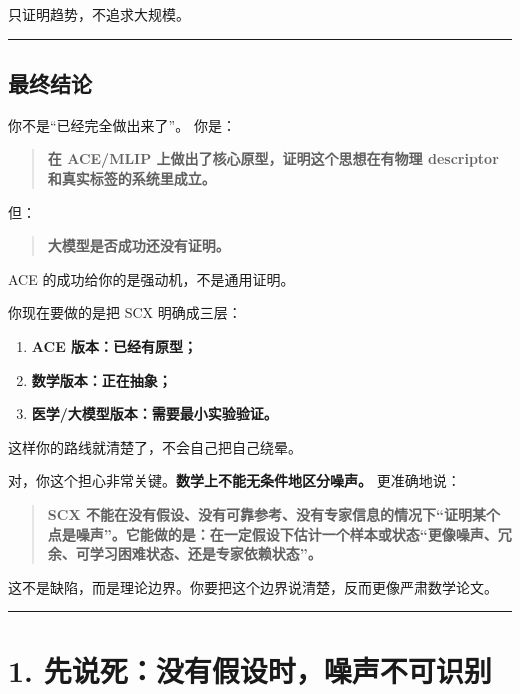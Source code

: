 \documentclass[
  12pt,
]{ctexart}
\providecommand{\tightlist}{%
  \setlength{\itemsep}{0pt}\setlength{\parskip}{0pt}}
\begin{document}
只证明趋势，不追求大规模。

\begin{center}\rule{0.5\linewidth}{0.5pt}\end{center}

\subsection{最终结论}\label{ux6700ux7ec8ux7ed3ux8bba}

你不是``已经完全做出来了''。 你是：

\begin{quote}
\textbf{在 ACE/MLIP 上做出了核心原型，证明这个思想在有物理 descriptor
和真实标签的系统里成立。}
\end{quote}

但：

\begin{quote}
\textbf{大模型是否成功还没有证明。}
\end{quote}

ACE 的成功给你的是强动机，不是通用证明。

你现在要做的是把 SCX 明确成三层：

\begin{enumerate}
\def\labelenumi{\arabic{enumi}.}
\tightlist
\item
  \textbf{ACE 版本：已经有原型；}
\item
  \textbf{数学版本：正在抽象；}
\item
  \textbf{医学/大模型版本：需要最小实验验证。}
\end{enumerate}

这样你的路线就清楚了，不会自己把自己绕晕。

对，你这个担心非常关键。\textbf{数学上不能无条件地区分噪声。}
更准确地说：

\begin{quote}
\textbf{SCX
不能在没有假设、没有可靠参考、没有专家信息的情况下``证明某个点是噪声''。它能做的是：在一定假设下估计一个样本或状态``更像噪声、冗余、可学习困难状态、还是专家依赖状态''。}
\end{quote}

这不是缺陷，而是理论边界。你要把这个边界说清楚，反而更像严肃数学论文。

\begin{center}\rule{0.5\linewidth}{0.5pt}\end{center}

\section{1.
先说死：没有假设时，噪声不可识别}\label{ux5148ux8bf4ux6b7bux6ca1ux6709ux5047ux8bbeux65f6ux566aux58f0ux4e0dux53efux8bc6ux522b}
\end{document}

